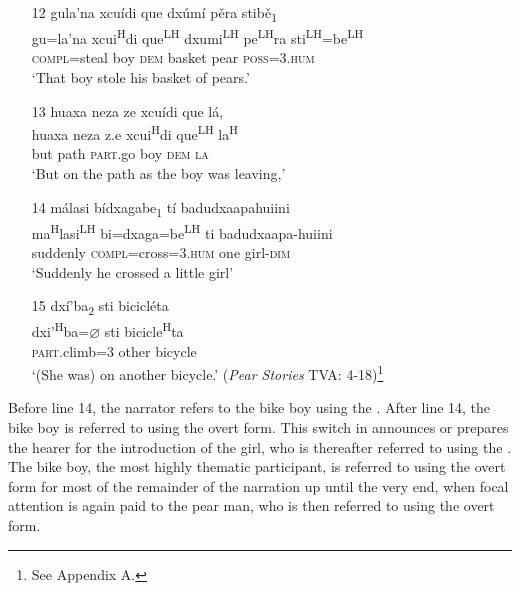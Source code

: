\begin{itemize}
\item[12]
\glll gula'na xcu\'{i}di que dx\'{u}m\'{i} p\v{e}ra stib\v{e}\textsubscript{1} \\
gu=la'na xcui\textsuperscript{H}di que\textsuperscript{LH} dxumi\textsuperscript{LH} pe\textsuperscript{LH}ra sti\textsuperscript{LH}=be\textsuperscript{LH}  \\
\textsc{compl}=steal boy \textsc{dem} basket pear \textsc{poss}=\textsc{3.hum} \\
\glt `That boy stole his basket of pears.'


\item[13]
\glll huaxa neza ze xcu\'{i}di que l\'{a}, \\
huaxa neza z.e xcui\textsuperscript{H}di que\textsuperscript{LH} la\textsuperscript{H} \\
but path \textsc{part}.go boy \textsc{dem} \textsc{la} \\
\glt `But on the path as the boy was leaving,'


\item[14]
\glll m\'{a}lasi b\'{i}dxagabe\textsubscript{1} t\'{i} badudxaapahuiini \\
ma\textsuperscript{H}lasi\textsuperscript{LH} bi=dxaga=be\textsuperscript{LH}  ti badudxaapa-huiini \\
suddenly \textsc{compl}=cross=\textsc{3.hum} one girl-\textsc{dim} \\
\glt `Suddenly he crossed a little girl'


\item[15]
\glll dx\'{i}'ba\textsubscript{2} sti bicicl\'{e}ta \\
dxi'\textsuperscript{H}ba={$\varnothing$} sti bicicle\textsuperscript{H}ta \\
\textsc{part}.climb=\textsc{3} other bicycle \\
\glt `(She was) on another bicycle.' \hfill{(\textit{Pear Stories} TVA: 4-18)\footnote{See Appendix A.}}

\end{itemize}
\z

Before line 14, the narrator refers to the bike boy using the . After line 14, the bike boy is referred to using the overt form. This switch in  announces or prepares the hearer for the introduction of the girl, who is thereafter referred to using the . The bike boy, the most highly thematic participant, is referred to using the overt form for most of the remainder of the narration up until the very end, when focal attention is again paid to the pear man, who is then referred to using the overt form.

